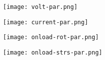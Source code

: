 \documentclass[11pt]{article}
\begin{document}
\begin{center}
\texttt{[image: volt-par.png]}
\end{center}

\begin{center}
\texttt{[image: current-par.png]}
\end{center}

\begin{center}
\texttt{[image: onload-rot-par.png]}
\end{center}

\begin{center}
\texttt{[image: onload-strs-par.png]}
\end{center}
\end{document}
